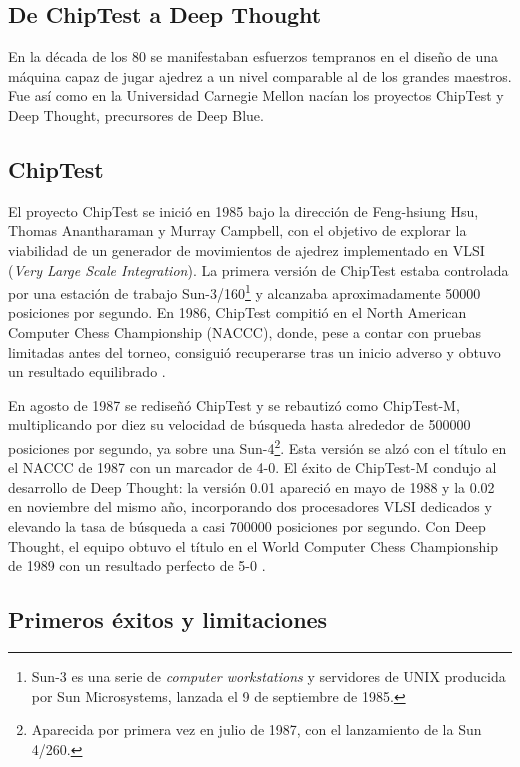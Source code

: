\documentclass[a4paper, 12pt]{article}
\begin{document}
\subsection{De ChipTest a Deep Thought}

En la década de los 80 se manifestaban esfuerzos tempranos en 
el diseño de una máquina capaz de jugar ajedrez a un nivel comparable
al de los grandes maestros. Fue así como en la Universidad 
Carnegie Mellon nacían los proyectos ChipTest y Deep Thought,
precursores de Deep Blue.


\subsection{ChipTest}
El proyecto ChipTest se inició en 1985 bajo la dirección de 
Feng-hsiung Hsu, Thomas 
Anantharaman y Murray Campbell, con el objetivo de explorar la 
viabilidad de un generador de movimientos de ajedrez 
implementado en VLSI (\emph{Very Large Scale Integration}). La primera versión de 
ChipTest estaba controlada por una estación de trabajo 
Sun-3/160\footnote{Sun-3 es una serie de \emph{computer workstations} y servidores de UNIX producida por Sun Microsystems, lanzada el 9 de septiembre de 1985.} 
y alcanzaba aproximadamente 50000 posiciones por 
segundo. En 1986, ChipTest compitió en el North 
American Computer Chess Championship (NACCC), donde, pese a contar con 
pruebas limitadas antes del torneo, consiguió recuperarse tras 
un inicio adverso y obtuvo un resultado equilibrado 
\cite{hsu1990deep}.

En agosto de 1987 se rediseñó ChipTest y se rebautizó como 
ChipTest-M, multiplicando por diez su velocidad de búsqueda 
hasta alrededor de 500000 posiciones por segundo, ya sobre una 
Sun-4\footnote{Aparecida por primera vez en julio de 1987, con el lanzamiento de la Sun 4/260.}. 
Esta versión se alzó con el título en el 
NACCC de 1987 con un marcador de 4-0. El éxito de 
ChipTest-M condujo al desarrollo de Deep Thought: la versión 
0.01 apareció en mayo de 1988 y la 0.02 en noviembre del mismo 
año, incorporando dos procesadores VLSI dedicados y elevando la 
tasa de búsqueda a casi 700000 posiciones por segundo. Con Deep Thought, el equipo obtuvo el título en 
el World Computer Chess Championship de 1989 con un resultado 
perfecto de 5-0 \cite{newborn1988results}.

\subsection{Primeros éxitos y limitaciones}
\end{document}
